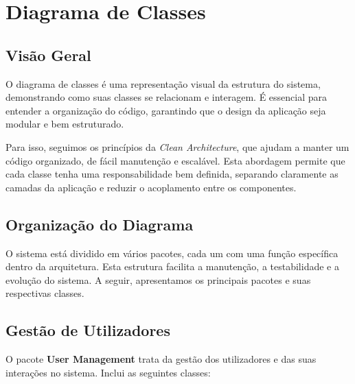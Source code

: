 \documentclass[a4paper, 12pt]{article} %
\begin{document}

\newpage
\section{Diagrama de Classes}

\subsection{Visão Geral}  

O diagrama de classes é uma representação visual da estrutura do sistema, demonstrando como suas classes se relacionam e interagem. É essencial para entender a organização do código, garantindo que o design da aplicação seja modular e bem estruturado.

Para isso, seguimos os princípios da \textit{Clean Architecture}, que ajudam a manter um código organizado, de fácil manutenção e escalável. Esta abordagem permite que cada classe tenha uma responsabilidade bem definida, separando claramente as camadas da aplicação e reduzir o acoplamento entre os componentes.

\subsection{Organização do Diagrama}  

O sistema está dividido em vários pacotes, cada um com uma função específica dentro da arquitetura. Esta estrutura facilita a manutenção, a testabilidade e a evolução do sistema. A seguir, apresentamos os principais pacotes e suas respectivas classes.

\subsection{Gestão de Utilizadores}

O pacote \textbf{User Management} trata da gestão dos utilizadores e das suas interações no sistema. Inclui as seguintes classes:
\end{document}
